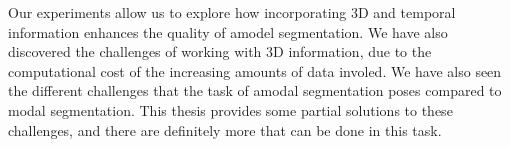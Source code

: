 Our experiments allow us to explore how incorporating 3D and temporal information enhances the quality of amodel segmentation. We have also discovered the challenges of working with 3D information, due to the computational cost of the increasing amounts of data involed. We have also seen the different challenges that the task of amodal segmentation poses compared to modal segmentation. This thesis provides some partial solutions to these challenges, and there are definitely more that can be done in this task. 